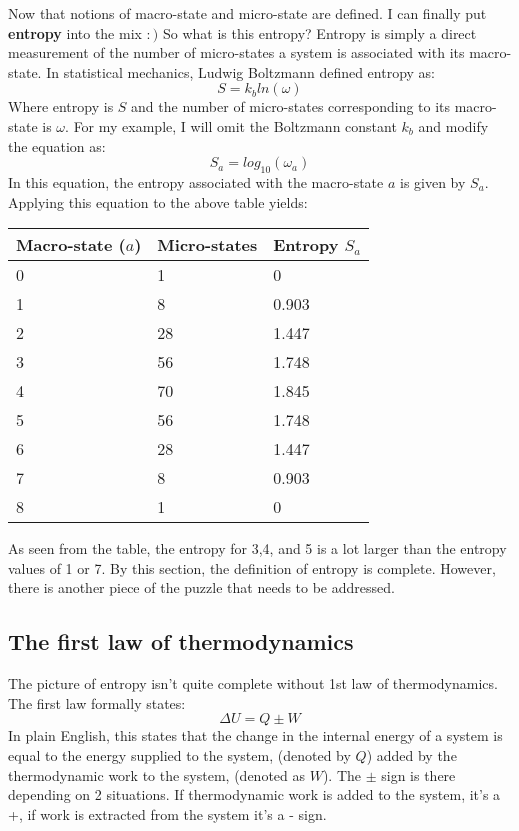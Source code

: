 \vspace{0,3cm}
Now that notions of macro-state and micro-state are defined. I can finally put \textbf{entropy} into the mix $: )$ So what is this entropy? Entropy is simply a direct measurement of the number of micro-states a system is associated with its macro-state. In statistical mechanics, Ludwig Boltzmann defined entropy as: 
\begin{equation*}
    S=k_bln(\omega)
\end{equation*}
Where entropy is $S$ and the number of micro-states corresponding to its macro-state is $\omega$. For my example, I will omit the Boltzmann constant $k_{b}$ and modify the equation as: 
\begin{equation*}
    S_{a}=log_{10}(\omega_{a})
\end{equation*}
In this equation, the entropy associated with the macro-state $a$ is given by $S_{a}$. Applying this equation to the above table yields: 
\begin{center}
\begin{tabular}{ |p{3cm}||p{3cm}||p{3cm}|  }
 \hline
Macro-state ($a$)& Micro-states & Entropy $S_{a}$\\
 \hline
 0   & 1 &0\\
 1&   8 &0.903\\
 2&28& 1.447 \\
 3&56 & 1.748\\
 4&70 &1.845\\
 5&56 & 1.748\\
 6&28 & 1.447\\
 7&8 & 0.903\\
 8&1 & 0\\
 \hline
\end{tabular}
\end{center} 
As seen from the table, the entropy for 3,4, and 5 is a lot larger than the entropy values of 1 or 7. By this section, the definition of entropy is complete. However, there is another piece of the puzzle that needs to be addressed. 
\pagebreak

\subsection{The first law of thermodynamics}
The picture of entropy isn't quite complete without 1st law of thermodynamics. The first law formally states: 
\begin{equation}
    \Delta U= Q \pm W
    \label{Eq:1}
\end{equation}
In plain English, this states that the change in the internal energy of a system is equal to the energy supplied to the system, (denoted by $Q$) added by the thermodynamic work to the system, (denoted as $W$). The $ \pm $ sign is there depending on 2 situations. If thermodynamic work is added to the system, it's a +, if work is extracted from the system it's a - sign. \par


